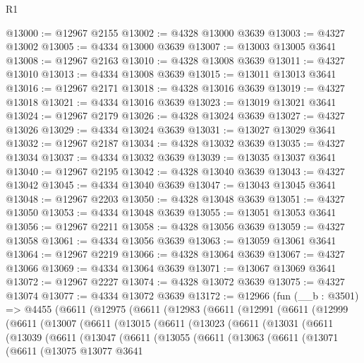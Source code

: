 \begin{lexlean}{R1}
\begin{coremodule}
@13000 := @12967 @2155
@13002 := @4328 @13000 @3639
@13003 := @4327 @13002
@13005 := @4334 @13000 @3639
@13007 := @13003 @13005 @3641
@13008 := @12967 @2163
@13010 := @4328 @13008 @3639
@13011 := @4327 @13010
@13013 := @4334 @13008 @3639
@13015 := @13011 @13013 @3641
@13016 := @12967 @2171
@13018 := @4328 @13016 @3639
@13019 := @4327 @13018
@13021 := @4334 @13016 @3639
@13023 := @13019 @13021 @3641
@13024 := @12967 @2179
@13026 := @4328 @13024 @3639
@13027 := @4327 @13026
@13029 := @4334 @13024 @3639
@13031 := @13027 @13029 @3641
@13032 := @12967 @2187
@13034 := @4328 @13032 @3639
@13035 := @4327 @13034
@13037 := @4334 @13032 @3639
@13039 := @13035 @13037 @3641
@13040 := @12967 @2195
@13042 := @4328 @13040 @3639
@13043 := @4327 @13042
@13045 := @4334 @13040 @3639
@13047 := @13043 @13045 @3641
@13048 := @12967 @2203
@13050 := @4328 @13048 @3639
@13051 := @4327 @13050
@13053 := @4334 @13048 @3639
@13055 := @13051 @13053 @3641
@13056 := @12967 @2211
@13058 := @4328 @13056 @3639
@13059 := @4327 @13058
@13061 := @4334 @13056 @3639
@13063 := @13059 @13061 @3641
@13064 := @12967 @2219
@13066 := @4328 @13064 @3639
@13067 := @4327 @13066
@13069 := @4334 @13064 @3639
@13071 := @13067 @13069 @3641
@13072 := @12967 @2227
@13074 := @4328 @13072 @3639
@13075 := @4327 @13074
@13077 := @4334 @13072 @3639
@13172 := @12966
    (fun (__b : @3501) =>
    @4455
      (@6611
        (@12975
          (@6611
            (@12983
              (@6611
                (@12991
                  (@6611
                    (@12999
                      (@6611
                        (@13007
                          (@6611
                            (@13015
                              (@6611
                                (@13023
                                  (@6611
                                    (@13031
                                      (@6611
                                        (@13039
                                          (@6611
                                            (@13047
                                              (@6611
                                                (@13055
                                                  (@6611
                                                    (@13063
                                                      (@6611
                                                        (@13071
                                                          (@6611
                                                            (@13075
                                                              @13077
                                                              @3641

\end{coremodule}
\end{lexlean}
